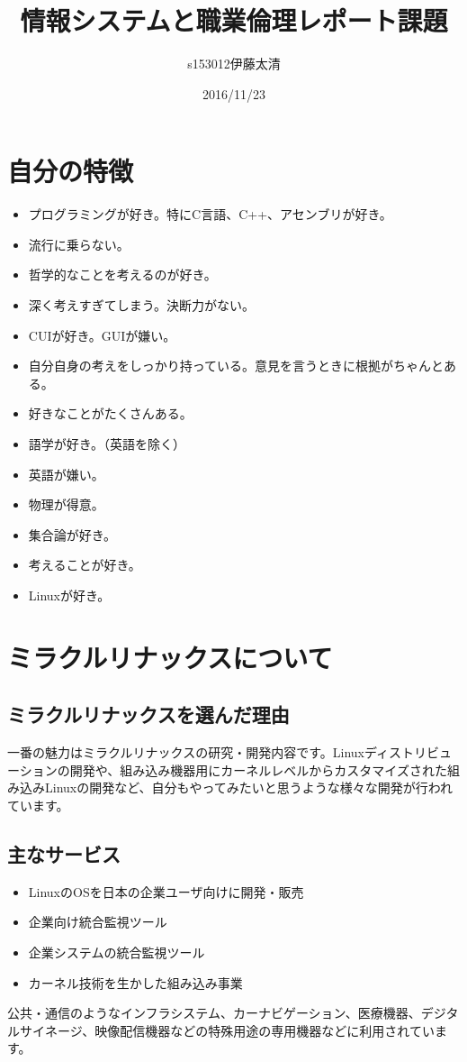 \documentclass[a4paper]{jsarticle}
\title{情報システムと職業倫理レポート課題}
\author{s153012伊藤太清}
\date{2016/11/23}
\begin{document}
\maketitle
\section{自分の特徴}
\begin{itemize}
	\item プログラミングが好き。特にC言語、C++、アセンブリが好き。
	\item 流行に乗らない。
	\item 哲学的なことを考えるのが好き。
	\item 深く考えすぎてしまう。決断力がない。
	\item CUIが好き。GUIが嫌い。
	\item 自分自身の考えをしっかり持っている。意見を言うときに根拠がちゃんとある。
	\item 好きなことがたくさんある。
	\item 語学が好き。（英語を除く）
	\item 英語が嫌い。
	\item 物理が得意。
	\item 集合論が好き。
	\item 考えることが好き。
	\item Linuxが好き。
\end{itemize}
\section{ミラクルリナックスについて}
\subsection{ミラクルリナックスを選んだ理由}
一番の魅力はミラクルリナックスの研究・開発内容です。Linuxディストリビューションの開発や、組み込み機器用にカーネルレベルからカスタマイズされた組み込みLinuxの開発など、自分もやってみたいと思うような様々な開発が行われています。
\subsection{主なサービス}
\begin{itemize}
	\item LinuxのOSを日本の企業ユーザ向けに開発・販売
	\item 企業向け統合監視ツール
	\item 企業システムの統合監視ツール
	\item カーネル技術を生かした組み込み事業
\end{itemize}
公共・通信のようなインフラシステム、カーナビゲーション、医療機器、デジタルサイネージ、映像配信機器などの特殊用途の専用機器などに利用されています。
\end{document}
